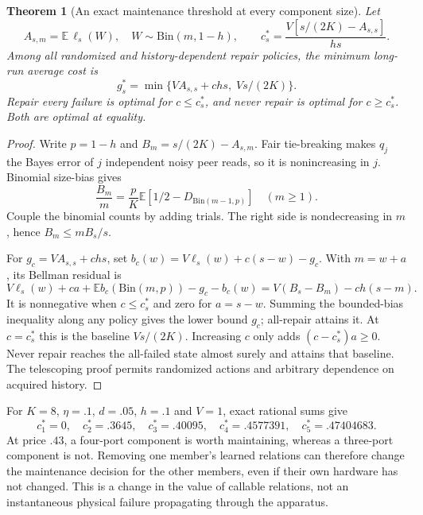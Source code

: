 \documentclass[11pt]{article}
\newtheorem{theorem}{Theorem}[section]
\theoremstyle{definition}
\theoremstyle{remark}
\newcommand{\E}{\mathbb E}
\begin{document}
\begin{theorem}[An exact maintenance threshold at every component size]
\label{thm:maintenance}
Let
\[
 A_{s,m}=\E\,\ell_s(W),\quad W\sim\mathrm{Bin}(m,1-h),\qquad
 c_s^*=\frac{V[s/(2K)-A_{s,s}]}{hs}.
\]
Among all randomized and history-dependent repair policies, the minimum
long-run average cost is
\begin{equation}\label{eq:maintenance_optimum}
 g_s^*=\min\{VA_{s,s}+chs,\;Vs/(2K)\}.
\end{equation}
Repair every failure is optimal for $c\le c_s^*$, and never repair is
optimal for $c\ge c_s^*$. Both are optimal at equality.
\end{theorem}
\begin{proof}
Write $p=1-h$ and $B_m=s/(2K)-A_{s,m}$. Fair tie-breaking makes $q_j$
the Bayes error of $j$ independent noisy peer reads, so it is
nonincreasing in $j$. Binomial size-bias gives
\[
 \frac{B_m}{m}=\frac pK
  \E[1/2-D_{\mathrm{Bin}(m-1,p)}]\quad(m\ge1).
\]
Couple the binomial counts by adding trials. The right side is
nondecreasing in $m$, hence $B_m\le mB_s/s$.

For $g_c=VA_{s,s}+chs$, set
$b_c(w)=V\ell_s(w)+c(s-w)-g_c$. With $m=w+a$, its Bellman residual is
\[
 V\ell_s(w)+ca+\E b_c(\mathrm{Bin}(m,p))-g_c-b_c(w)
  =V(B_s-B_m)-ch(s-m).
\]
It is nonnegative when $c\le c_s^*$ and zero for $a=s-w$.
Summing the bounded-bias inequality along any policy gives the lower
bound $g_c$; all-repair attains it. At $c=c_s^*$ this is the baseline
$Vs/(2K)$. Increasing $c$ only adds $(c-c_s^*)a\ge0$.
Never repair reaches the all-failed state almost surely and attains
that baseline. The telescoping proof permits randomized actions and
arbitrary dependence on acquired history.
\end{proof}

For $K=8$, $\eta=.1$, $d=.05$, $h=.1$ and $V=1$, exact rational sums give
\[
 c_1^*=0,\quad c_2^*=.3645,\quad c_3^*=.40095,\quad
 c_4^*=.4577391,\quad c_5^*=.47404683.
\]
At price $.43$, a four-port component is worth maintaining, whereas a
three-port component is not. Removing one member's learned relations
can therefore change the maintenance decision for the other members,
even if their own hardware has not changed. This is a change in the
value of callable relations, not an instantaneous physical failure
propagating through the apparatus.
\end{document}
